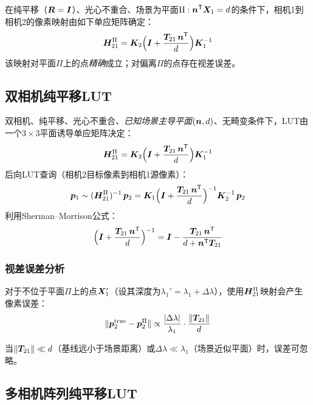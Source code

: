\begin{theorem}[纯平移平面单应]
在纯平移（$\bm{R}=\bm{I}$）、光心不重合、场景为平面$\Pi: \bm{n}^{\mathsf{T}}\bm{X}_1 = d$的条件下，相机1到相机2的像素映射由如下单应矩阵确定：
\begin{equation}
\bm{H}_{21}^{\Pi} = \bm{K}_2\Bigl(\bm{I} + \frac{\bm{T}_{21}\,\bm{n}^{\mathsf{T}}}{d}\Bigr)\bm{K}_1^{-1}
\label{eq:H-plane-trans}
\end{equation}
该映射对平面$\Pi$上的点\emph{精确}成立；对偏离$\Pi$的点存在视差误差。
\end{theorem}

\subsection{双相机纯平移LUT}
\label{sec:dual-trans}

\begin{finalbox}
双相机、纯平移、光心不重合、\emph{已知场景主导平面}$(\bm{n}, d)$、无畸变条件下，LUT由一个$3\times 3$平面诱导单应矩阵决定：
\[
\bm{H}_{21}^{\Pi} = \bm{K}_2\Bigl(\bm{I} + \frac{\bm{T}_{21}\,\bm{n}^{\mathsf{T}}}{d}\Bigr)\bm{K}_1^{-1}
\]
后向LUT查询（相机2目标像素到相机1源像素）：
\[
\bm{p}_1 \sim (\bm{H}_{21}^{\Pi})^{-1}\,\bm{p}_2
      = \bm{K}_1\Bigl(\bm{I} + \frac{\bm{T}_{21}\,\bm{n}^{\mathsf{T}}}{d}\Bigr)^{-1}\bm{K}_2^{-1}\,\bm{p}_2
\]
利用Sherman--Morrison公式：
\[
\Bigl(\bm{I} + \frac{\bm{T}_{21}\,\bm{n}^{\mathsf{T}}}{d}\Bigr)^{-1}
= \bm{I} - \frac{\bm{T}_{21}\,\bm{n}^{\mathsf{T}}}{d + \bm{n}^{\mathsf{T}}\bm{T}_{21}}
\]
\end{finalbox}

\subsubsection{视差误差分析}

对于不位于平面$\Pi$上的点$\bm{X}_1'$（设其深度为$\lambda_1' = \lambda_1 + \Delta\lambda$），使用$\bm{H}_{21}^{\Pi}$映射会产生像素误差：
\begin{equation}
\|\bm{p}_2^{\text{true}} - \bm{p}_2^{\Pi}\| \propto
\frac{|\Delta\lambda|}{\lambda_1}\cdot\frac{\|\bm{T}_{21}\|}{d}
\label{eq:parallax-error}
\end{equation}

当$\|\bm{T}_{21}\| \ll d$（基线远小于场景距离）或$\Delta\lambda \ll \lambda_1$（场景近似平面）时，误差可忽略。

\subsection{多相机阵列纯平移LUT}
\label{sec:multi-trans}

